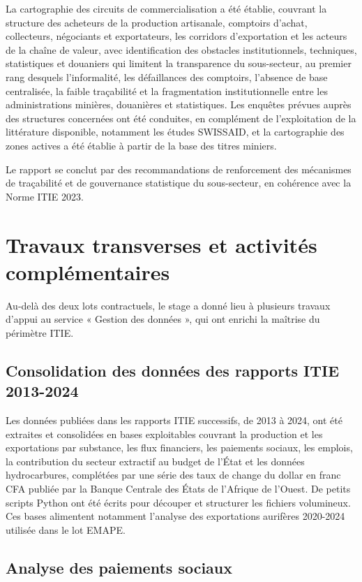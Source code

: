 \documentclass[12pt, a4paper]{article}
\begin{document}
La cartographie des circuits de commercialisation a été établie, couvrant la
structure des acheteurs de la production artisanale, comptoirs d'achat,
collecteurs, négociants et exportateurs, les corridors d'exportation et les
acteurs de la chaîne de valeur, avec identification des obstacles institutionnels, techniques,
statistiques et douaniers qui limitent la transparence du sous-secteur, au
premier rang desquels l'informalité, les défaillances des comptoirs, l'absence
de base centralisée, la faible traçabilité et la fragmentation institutionnelle
entre les administrations minières, douanières et statistiques. Les enquêtes prévues auprès des structures concernées ont été conduites, en
complément de l'exploitation de la littérature disponible, notamment les
études SWISSAID, et la cartographie des zones actives a été établie à partir
de la base des titres miniers.

Le rapport se conclut par des recommandations de renforcement des mécanismes de
traçabilité et de gouvernance statistique du sous-secteur, en cohérence avec la
Norme ITIE 2023.

\section{Travaux transverses et activités complémentaires}

Au-delà des deux lots contractuels, le stage a donné lieu à plusieurs travaux
d'appui au service « Gestion des données », qui ont enrichi la maîtrise du
périmètre ITIE.

\subsection{Consolidation des données des rapports ITIE 2013-2024}

Les données publiées dans les rapports ITIE successifs, de 2013 à 2024, ont été
extraites et consolidées en bases exploitables couvrant la production et les
exportations par substance, les flux financiers, les paiements sociaux, les
emplois, la contribution du secteur extractif au budget de l'État et les
données hydrocarbures, complétées par une série des taux de change du dollar en franc CFA publiée
par la Banque Centrale des États de l'Afrique de l'Ouest. De petits scripts Python ont été
écrits pour découper et structurer les fichiers volumineux. Ces bases
alimentent notamment l'analyse des exportations aurifères 2020-2024 utilisée
dans le lot EMAPE.

\subsection{Analyse des paiements sociaux}
\end{document}
